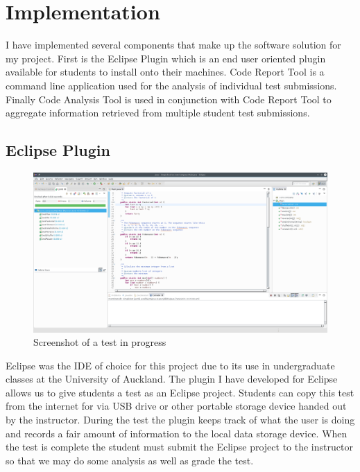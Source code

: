 \documentclass[twocolumn]{article}
\begin{document}
\section{Implementation}

I have implemented several components that make up the software solution for my
project. First is the Eclipse Plugin which is an end user oriented plugin
available for students to install onto their machines. Code Report Tool is a
command line application used for the analysis of individual test submissions.
Finally Code Analysis Tool is used in conjunction with Code Report Tool to
aggregate information retrieved from multiple student test submissions.

\subsection{Eclipse Plugin}

\begin{figure}[h!]
\centering
\includegraphics[width=\linewidth]{figures/eclipse}
\caption{Screenshot of a test in progress}
\end{figure}

Eclipse was the IDE of choice for this project due to its use in undergraduate
classes at the University of Auckland. The plugin I have developed for Eclipse
allows us to give students a test as an Eclipse project. Students can copy this
test from the internet for via USB drive or other portable storage device
handed out by the instructor. During the test the plugin keeps track of what
the user is doing and records a fair amount of information to the local data
storage device. When the test is complete the student must submit the Eclipse
project to the instructor so that we may do some analysis as well as grade the
test.\\
\end{document}
